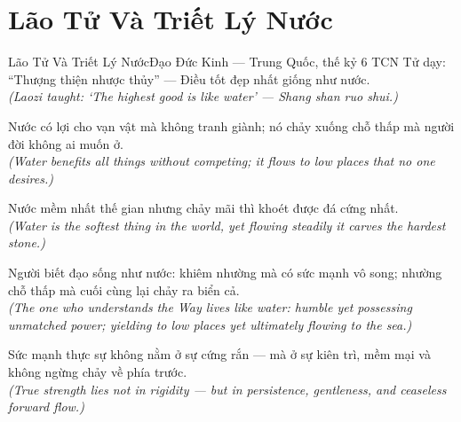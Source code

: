\section{Lão Tử Và Triết Lý Nước}
\begin{truyen}{Lão Tử Và Triết Lý Nước}{Đạo Đức Kinh --- Trung Quốc, thế kỷ 6 TCN}
 Tử dạy: ``Thượng thiện nhược thủy'' --- Điều tốt đẹp nhất giống như nước.\\[4pt]
\textit{(Laozi taught: `The highest good is like water' --- Shang shan ruo shui.)}

Nước có lợi cho vạn vật mà không tranh giành; nó chảy xuống chỗ thấp mà người đời không ai muốn ở.\\[4pt]
\textit{(Water benefits all things without competing; it flows to low places that no one desires.)}

Nước mềm nhất thế gian nhưng chảy mãi thì khoét được đá cứng nhất.\\[4pt]
\textit{(Water is the softest thing in the world, yet flowing steadily it carves the hardest stone.)}

Người biết đạo sống như nước: khiêm nhường mà có sức mạnh vô song; nhường chỗ thấp mà cuối cùng lại chảy ra biển cả.\\[4pt]
\textit{(The one who understands the Way lives like water: humble yet possessing unmatched power; yielding to low places yet ultimately flowing to the sea.)}

\end{truyen}
\begin{baihoc}
  Sức mạnh thực sự không nằm ở sự cứng rắn --- mà ở sự kiên trì, mềm mại và không ngừng chảy về phía trước.\\[4pt]
  \textit{(True strength lies not in rigidity --- but in persistence, gentleness, and ceaseless forward flow.)}
\end{baihoc}
